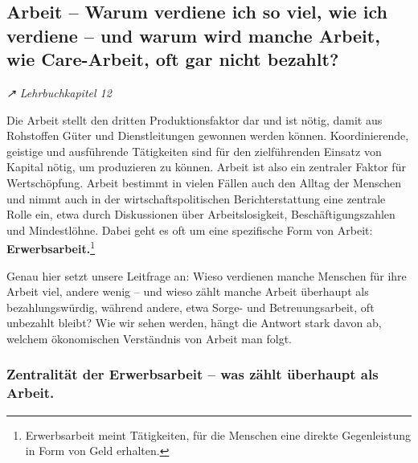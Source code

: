 \documentclass[
  nswissgerman,
  a4paper,
  DIV=11,
  numbers=noendperiod,
  oneside,
  openany]{scrreprt}
\begin{document}
\subsection{Arbeit -- Warum verdiene ich so viel, wie ich verdiene --
und warum wird manche Arbeit, wie Care-Arbeit, oft gar nicht
bezahlt?}\label{arbeit-warum-verdiene-ich-so-viel-wie-ich-verdiene-und-warum-wird-manche-arbeit-wie-care-arbeit-oft-gar-nicht-bezahlt}

\emph{↗ Lehrbuchkapitel 12}

Die Arbeit stellt den dritten Produktionsfaktor dar und ist nötig, damit
aus Rohstoffen Güter und Dienstleitungen gewonnen werden können.
Koordinierende, geistige und ausführende Tätigkeiten sind für den
zielführenden Einsatz von Kapital nötig, um produzieren zu können.
Arbeit ist also ein zentraler Faktor für Wertschöpfung. Arbeit bestimmt
in vielen Fällen auch den Alltag der Menschen und nimmt auch in der
wirtschaftspolitischen Berichterstattung eine zentrale Rolle ein, etwa
durch Diskussionen über Arbeitslosigkeit, Beschäftigungszahlen und
Mindestlöhne. Dabei geht es oft um eine spezifische Form von Arbeit:
\textbf{Erwerbsarbeit.}\footnote{Erwerbsarbeit meint Tätigkeiten, für
  die Menschen eine direkte Gegenleistung in Form von Geld erhalten.}

Genau hier setzt unsere Leitfrage an: Wieso verdienen manche Menschen
für ihre Arbeit viel, andere wenig -- und wieso zählt manche Arbeit
überhaupt als bezahlungswürdig, während andere, etwa Sorge- und
Betreuungsarbeit, oft unbezahlt bleibt? Wie wir sehen werden, hängt die
Antwort stark davon ab, welchem ökonomischen Verständnis von Arbeit man
folgt.

\subsubsection{Zentralität der Erwerbsarbeit -- was zählt überhaupt als
Arbeit.}\label{zentralituxe4t-der-erwerbsarbeit-was-zuxe4hlt-uxfcberhaupt-als-arbeit.}
\end{document}
